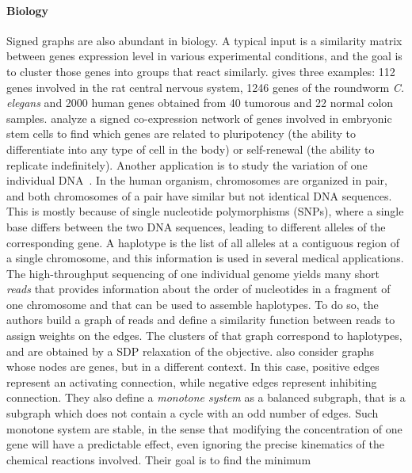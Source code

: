      \paragraph{Biology}
      Signed graphs are also abundant in biology.
      A typical input is a similarity matrix between genes expression level in various experimental conditions,
      and the goal is to cluster those genes into groups that react similarly. \Textcite[Section
      4]{Ben-Dor99} gives three examples: 112 genes involved in the rat central nervous system, 1246
      genes of the roundworm \emph{C. elegans} and 2000 human genes obtained from 40 tumorous and 22
      normal colon samples. \Textcite{Mason2009} analyze a signed co-expression network of genes
      involved in embryonic stem cells to find which genes are related to pluripotency (the ability
      to differentiate into any type of cell in the body) or self-renewal (the ability to replicate
      indefinitely). Another application is to study the variation of one individual
      DNA~\autocite{Das2015}. In the human organism, chromosomes are organized in pair, and both
      chromosomes of a pair have similar but not identical DNA sequences. This is mostly because of
      single nucleotide polymorphisms (SNPs), where a single base differs between the two DNA
      sequences, leading to different alleles of the corresponding gene. A haplotype is the list of
      all alleles at a contiguous region of a single chromosome, and this information is
      used in several medical applications. The high-throughput sequencing of one individual genome
      yields many short \emph{reads} that provides information about the order of nucleotides in a
      fragment of one chromosome and that can be used to assemble haplotypes. To do so, the authors
      build a graph of reads and define a similarity function between reads to assign weights on the
      edges. The clusters of that graph correspond to haplotypes, and are obtained by a SDP
      relaxation of the \pcc{} objective. \Textcite{monotoneBiology07} also consider graphs whose
      nodes are genes, but in a different context. In this case, positive edges represent an
      activating connection, while negative edges represent inhibiting connection. They also define
      a \emph{monotone system} as a balanced subgraph, that is a subgraph which does not contain a
      cycle with an odd number of edges. Such monotone system are stable, in the sense that
      modifying the concentration of one gene will have a predictable effect, even ignoring the
      precise kinematics of the chemical reactions involved. Their goal is to find the minimum
